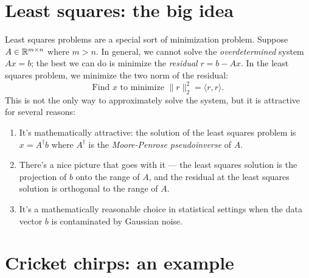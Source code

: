 \documentclass[12pt, leqno]{article}
\begin{document}

\section{Least squares: the big idea}

Least squares problems are a special sort of minimization problem.
Suppose $A \in \mathbb{R}^{m \times n}$ where $m > n$.  In general, we
cannot solve the {\em overdetermined} system $Ax = b$; the best we can do is minimize the
{\em residual} $r = b-Ax$.  In the least squares problem, we minimize
the two norm of the residual:
\[
\mbox{Find } x \mbox{ to minimize } \|r\|_2^2 =
\langle r, r \rangle.
\]
This is not the only way to approximately solve the system, but it
is attractive for several reasons:
\begin{enumerate}
\item It's mathematically attractive: the solution of the least
  squares problem is $x = A^\dagger b$ where $A^\dagger$ is the {\em
    Moore-Penrose pseudoinverse} of $A$.
\item There's a nice picture that goes with it --- the least squares
  solution is the projection of $b$ onto the range of $A$, and the
  residual at the least squares solution is orthogonal to the range of
  $A$.
\item It's a mathematically reasonable choice in statistical settings
  when the data vector $b$ is contaminated by Gaussian noise.
\end{enumerate}

\section*{Cricket chirps: an example}
\end{document}
